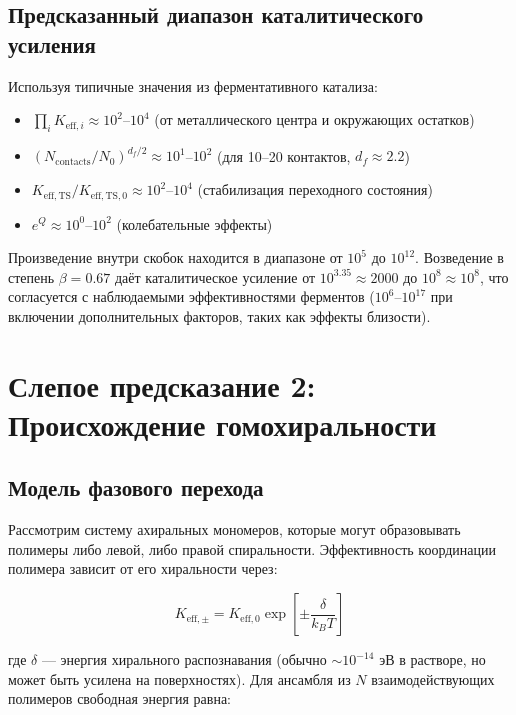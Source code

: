 \documentclass[12pt,a4paper]{article}
\theoremstyle{remark}
\newcommand{\df}{d_{\!f}}
\begin{document}
	\subsection{Предсказанный диапазон каталитического усиления}
	
	Используя типичные значения из ферментативного катализа:
	\begin{itemize}
		\item $\prod_i K_{\mathrm{eff},i} \approx 10^2$--$10^4$ (от металлического центра и окружающих остатков)
		\item $(N_{\text{contacts}}/N_0)^{\df/2} \approx 10^1$--$10^2$ (для 10–20 контактов, $\df \approx 2.2$)
		\item $K_{\mathrm{eff},\text{TS}}/K_{\mathrm{eff},\text{TS},0} \approx 10^2$--$10^4$ (стабилизация переходного состояния)
		\item $e^{Q} \approx 10^0$--$10^2$ (колебательные эффекты)
	\end{itemize}
	
	Произведение внутри скобок находится в диапазоне от $10^5$ до $10^{12}$. Возведение в степень $\beta = 0.67$ даёт каталитическое усиление от $10^{3.35} \approx 2000$ до $10^{8} \approx 10^8$, что согласуется с наблюдаемыми эффективностями ферментов ($10^6$--$10^{17}$ при включении дополнительных факторов, таких как эффекты близости).
	
	\section{Слепое предсказание 2: Происхождение гомохиральности}
	\label{sec:chirality}
	
	\subsection{Модель фазового перехода}
	
	Рассмотрим систему ахиральных мономеров, которые могут образовывать полимеры либо левой, либо правой спиральности. Эффективность координации полимера зависит от его хиральности через:
	
	\begin{equation}
		K_{\mathrm{eff},\pm} = K_{\mathrm{eff},0} \exp\left[\pm \frac{\delta}{k_B T}\right]
		\label{eq:keff-chiral}
	\end{equation}
	
	где $\delta$ — энергия хирального распознавания (обычно $\sim 10^{-14}$ эВ в растворе, но может быть усилена на поверхностях). Для ансамбля из $N$ взаимодействующих полимеров свободная энергия равна:
	
\end{document}
